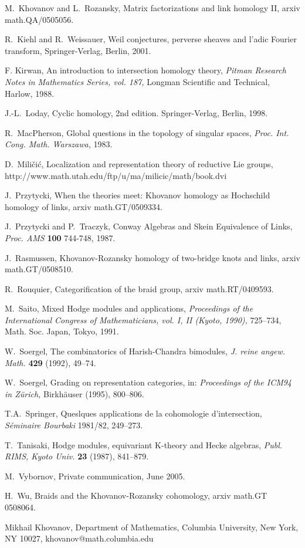 \documentclass[12pt]{article}
\begin{document}
\noindent
[KR2] M.~Khovanov and L.~Rozansky, Matrix factorizations and
link homology II, arxiv math.QA/0505056. 

\noindent 
[KW] R.~Kiehl and R.~Weissauer, Weil conjectures, perverse sheaves 
and l'adic Fourier transform, Springer-Verlag, Berlin, 2001. 

\noindent 
[Ki] F. Kirwan, An introduction to intersection homology theory, 
\emph{Pitman Research Notes in Mathematics Series, vol. 187,} 
Longman Scientific and Technical, Harlow, 1988.

\noindent
[L] J.-L.~Loday, Cyclic homology, 2nd edition. Springer-Verlag, Berlin, 1998. 

\noindent
[M] R.~MacPherson, Global questions in the topology of 
singular spaces, \emph{Proc. Int. Cong. Math. Warszawa,} 1983. 

\noindent
[Mi] D.~Mili\v{c}i\'c, Localization and representation theory 
of reductive Lie groups,  http://www.math.utah.edu/ftp/u/ma/milicic/math/book.dvi

\noindent 
[P] J.~Przytycki, When the theories meet: Khovanov homology as 
Hochschild homology of links, arxiv math.GT/0509334. 

\noindent 
[PT] J.~Przytycki and P.~Traczyk, Conway Algebras and
Skein Equivalence of Links, \emph{ Proc. AMS}  {\bf 100}  744-748, 1987.

\noindent
[Ra] J.~Rasmussen, Khovanov-Rozansky homology of two-bridge knots 
and links, arxiv math.GT/0508510.

\noindent 
[R] R.~Rouquier, Categorification of the braid group, arxiv 
math.RT/0409593. 
 
\noindent
[Sa] M.~Saito, Mixed Hodge modules and applications, 
\emph{Proceedings of the International Congress of Mathematicians, 
vol. I, II (Kyoto, 1990),} 725--734, Math. Soc. Japan, Tokyo, 1991. 

\noindent 
[S1] W.~Soergel, The combinatorics of Harish-Chandra bimodules, 
\emph{J. reine angew. Math.} {\bf 429} (1992), 49--74. 

\noindent
[S2] W.~Soergel, Grading on representation categories, in: 
\emph{Proceedings of the ICM94 in Zürich,} Birkhäuser (1995), 800--806. 

\noindent
[Sp] T.A.~Springer, Queslques applications de la cohomologie 
d'intersection, \emph{S\'eminaire Bourbaki} 1981/82, 249--273. 

\noindent 
[T] T.~Tanisaki, Hodge modules, equivariant K-theory and Hecke 
algebras, \emph{Publ. RIMS, Kyoto Univ.} {\bf 23} (1987), 841--879. 

\noindent 
[V] M.~Vybornov, Private communication, June 2005. 

\noindent 
[W] H.~Wu, Braids and the Khovanov-Rozansky cohomology, 
arxiv math.GT 0508064. 

\vspace{0.2in} 

\noindent 
Mikhail Khovanov, Department of Mathematics, Columbia University, 
New York, NY 10027, khovanov@math.columbia.edu
 
\end{document}
